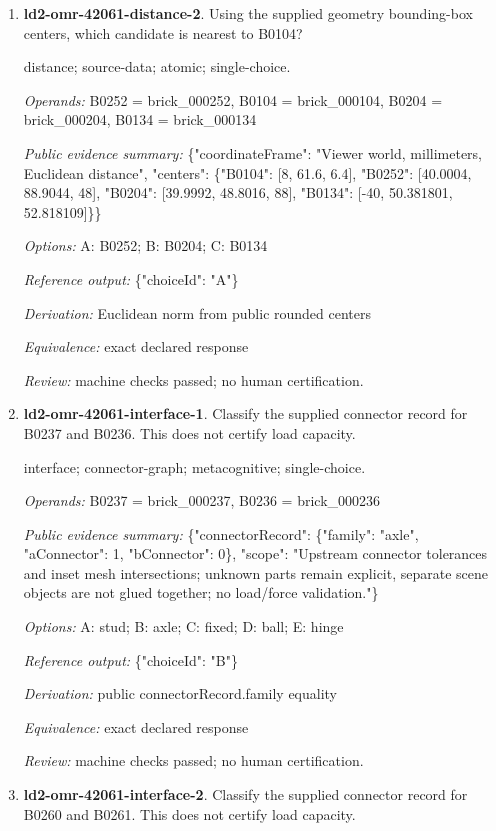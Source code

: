 \begin{enumerate}
\item \textbf{ld2-omr-42061-distance-2}. Using the supplied geometry bounding-box centers, which candidate is nearest to B0104?
\par{\small distance; source-data; atomic; single-choice.\par\textit{Operands:} B0252 = brick\_000252, B0104 = brick\_000104, B0204 = brick\_000204, B0134 = brick\_000134\par\textit{Public evidence summary:} \{"coordinateFrame": "Viewer world, millimeters, Euclidean distance", "centers": \{"B0104": [8, 61.6, 6.4], "B0252": [40.0004, 88.9044, 48], "B0204": [39.9992, 48.8016, 88], "B0134": [-40, 50.381801, 52.818109]\}\}\par\textit{Options:} A: B0252; B: B0204; C: B0134\par\textit{Reference output:} \{"choiceId": "A"\}\par\textit{Derivation:} Euclidean norm from public rounded centers\par\textit{Equivalence:} exact declared response\par\textit{Review:} machine checks passed; no human certification.}
\item \textbf{ld2-omr-42061-interface-1}. Classify the supplied connector record for B0237 and B0236. This does not certify load capacity.
\par{\small interface; connector-graph; metacognitive; single-choice.\par\textit{Operands:} B0237 = brick\_000237, B0236 = brick\_000236\par\textit{Public evidence summary:} \{"connectorRecord": \{"family": "axle", "aConnector": 1, "bConnector": 0\}, "scope": "Upstream connector tolerances and inset mesh intersections; unknown parts remain explicit, separate scene objects are not glued together; no load/force validation."\}\par\textit{Options:} A: stud; B: axle; C: fixed; D: ball; E: hinge\par\textit{Reference output:} \{"choiceId": "B"\}\par\textit{Derivation:} public connectorRecord.family equality\par\textit{Equivalence:} exact declared response\par\textit{Review:} machine checks passed; no human certification.}
\item \textbf{ld2-omr-42061-interface-2}. Classify the supplied connector record for B0260 and B0261. This does not certify load capacity.

\end{enumerate}
